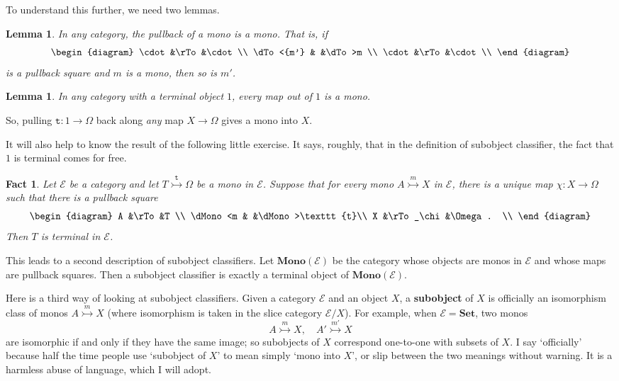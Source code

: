 \documentclass{article}
\newcommand{\cat}[1]{\mathscr{#1}}
\newcommand{\fcat}[1]{\mathbf{#1}}
\newcommand{\Set}{\fcat{Set}}
\newcommand{\demph}[1]{\textbf{\textup{#1}}}
\newcommand{\tr}{\texttt{t}}
\newcommand{\E}{\cat{E}}
\newcommand{\Mono}{\fcat{Mono}}
\newcommand{\monic}{\rightarrowtail}
\newcommand{\monicby}[1]{\stackrel{#1}{\monic}}
\newcommand{\cln}{\colon}
\newtheorem{lemma}[thm]{Lemma}
\newtheorem{fact}[thm]{Fact}
\begin{document}
To understand this further, we need two lemmas.

\begin{lemma}   \label{lemma:pb-mono}
In any category, the pullback of a mono is a mono.  That is, if
\[
\begin{diagram}
\cdot           &\rTo   &\cdot  \\
\dTo<{m'}       &       &\dTo>m \\
\cdot           &\rTo   &\cdot  \\
\end{diagram}
\]
is a pullback square and $m$ is a mono, then so is $m'$.  
\end{lemma}

\begin{lemma}
In any category with a terminal object $1$, every map out of $1$ is a mono.
\end{lemma}

So, pulling $\tr\cln 1 \to \Omega$ back along \emph{any} map $X \to \Omega$
gives a mono into $X$.

It will also help to know the result of the following little exercise.  It
says, roughly, that in the definition of subobject classifier, the fact that
$1$ is terminal comes for free.

\begin{fact}    \label{fact:one-terminal}
Let $\E$ be a category and let $T \monicby{\tr} \Omega$ be a mono in $\E$.
Suppose that for every mono $A \monicby{m} X$ in $\E$, there is a unique map
$\chi\cln X \to \Omega$ such that there is a pullback square
\[
\begin{diagram}
A               &\rTo           &T              \\
\dMono<m        &               &\dMono>\tr     \\
X               &\rTo_\chi      &\Omega.        \\
\end{diagram}
\]
Then $T$ is terminal in $\E$.
\end{fact}

This leads to a second description of subobject classifiers.  Let $\Mono(\E)$
be the category whose objects are monos in $\E$ and whose maps are pullback
squares.  Then a subobject classifier is exactly a terminal object of
$\Mono(\E)$.  

Here is a third way of looking at subobject classifiers.  Given a category
$\E$ and an object $X$, a \demph{subobject} of $X$ is officially an
isomorphism class of monos $A \monicby{m} X$ (where isomorphism is taken in the
slice category $\E/X$).  For example, when $\E = \Set$, two monos
\[
A \monicby{m} X, 
\quad
A' \monicby{m'} X
\]
are isomorphic if and only if they have the same image; so subobjects of $X$
correspond one-to-one with subsets of $X$.  I say `officially' because half
the time people use `subobject of $X$' to mean simply `mono into $X$', or slip
between the two meanings without warning.  It is a harmless abuse of
language, which I will adopt.   
\end{document}
